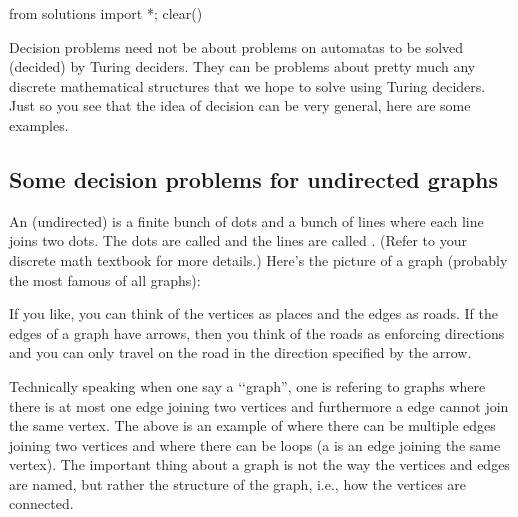 \begin{python0}
from solutions import *; clear()
\end{python0}

Decision problems need not be about problems on automatas to be solved
(decided) by Turing deciders.
They can be problems
about pretty much any discrete mathematical structures
that we hope to solve using Turing deciders.
Just so you see that the idea of decision can be
very general, here are some examples.

\newpage
\subsection{Some decision problems for undirected graphs}

  An (undirected)  is a finite bunch of dots and a bunch of lines where
  each line joins two dots.
  The dots are called  and the lines are called
  .
  (Refer to your discrete math textbook for more details.)
Here's the picture of a graph (probably the most famous of all graphs):
\begin{center}
\end{center}
If you like, you can think of the vertices as places and
the edges as roads.
If the edges of a graph have arrows, then you think of
the roads as enforcing directions and you can only travel on the road
in the direction specified by the arrow.

Technically speaking when one say a \lq\lq graph'', one is
refering to graphs where there is at most one edge joining
two vertices and furthermore a edge cannot join the same vertex.
The above is an example of 
where there can be multiple edges joining two vertices
and where there can be loops (a 
is an edge joining the same vertex).
The important thing about a graph
is not the way the vertices and edges are named,
but rather the structure of the graph, i.e.,
how the vertices are connected.

